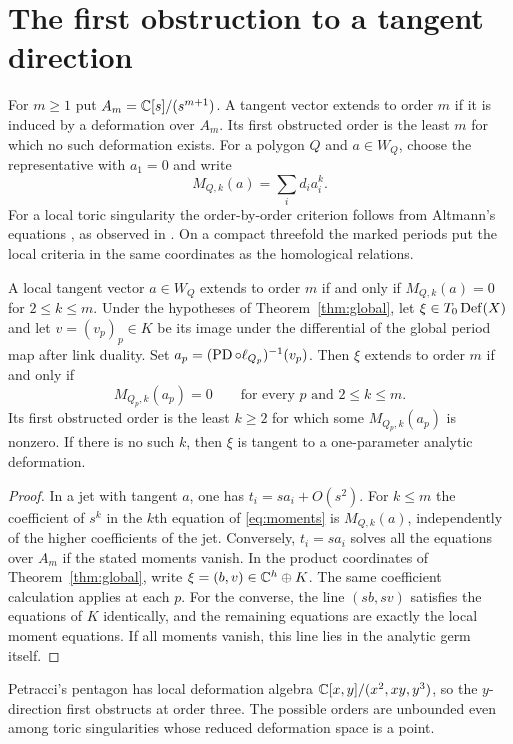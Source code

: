 \section{The first obstruction to a tangent direction}\label{sec:orders}

For $m\geq1$ put $A_m=\mathbb C[s]/(s^{m+1})$. A tangent vector extends to order $m$ if
it is induced by a deformation over $A_m$. Its first obstructed order
is the least $m$ for which no such deformation exists. For a polygon
$Q$ and $a\in W_Q$, choose the representative with $a_1=0$ and write
\[
                 M_{Q,k}(a)=\sum_i d_i a_i^k.
\]
For a local toric singularity the order-by-order criterion follows from
Altmann's equations \cite[\S2.3]{Alt}, as observed in
\cite[Appendix~A]{FHSU}. On a compact threefold the marked periods put
the local criteria in the same coordinates as the homological relations.

\begin{proposition}\label{prop:jet}
A local tangent vector $a\in W_Q$ extends to order $m$ if and only if
$M_{Q,k}(a)=0$ for $2\leq k\leq m$. Under the hypotheses of
Theorem~\ref{thm:global}, let $\xi\in T_0\operatorname{Def}(X)$ and let
$v=(v_p)_p\in K$ be its image under the differential of the global
period map after link duality. Set
$a_p=(\operatorname{PD}\circ\ell_{Q_p})^{-1}(v_p)$.
Then $\xi$ extends to order $m$ if and only if
\[
       M_{Q_p,k}(a_p)=0\qquad\text{for every $p$ and $2\leq k\leq m$.}
\]
Its first obstructed order is the least $k\geq2$ for which some
$M_{Q_p,k}(a_p)$ is nonzero. If there is no such $k$, then $\xi$ is
tangent to a one-parameter analytic deformation.
\end{proposition}

\begin{proof}
In a jet with tangent $a$, one has $t_i=s a_i+O(s^2)$. For $k\leq m$
the coefficient of $s^k$ in the $k$th equation of \eqref{eq:moments}
is $M_{Q,k}(a)$, independently of the higher coefficients of the jet.
Conversely, $t_i=s a_i$ solves all the equations over $A_m$ if the
stated moments vanish. In the product coordinates of
Theorem~\ref{thm:global}, write $\xi=(b,v)\in\mathbb C^h\oplus K$.
The same coefficient calculation applies at each $p$. For the converse,
the line $(s b,s v)$ satisfies the equations of $K$ identically, and
the remaining equations are exactly the local moment equations. If all
moments vanish, this line lies in the analytic germ itself.
\end{proof}

Petracci's pentagon \cite[Example~4.8]{Pet} has local deformation
algebra $\mathbb C[x,y]/(x^2,xy,y^3)$, so the $y$-direction first obstructs
at order three. The possible orders are unbounded even among toric
singularities whose reduced deformation space is a point.

